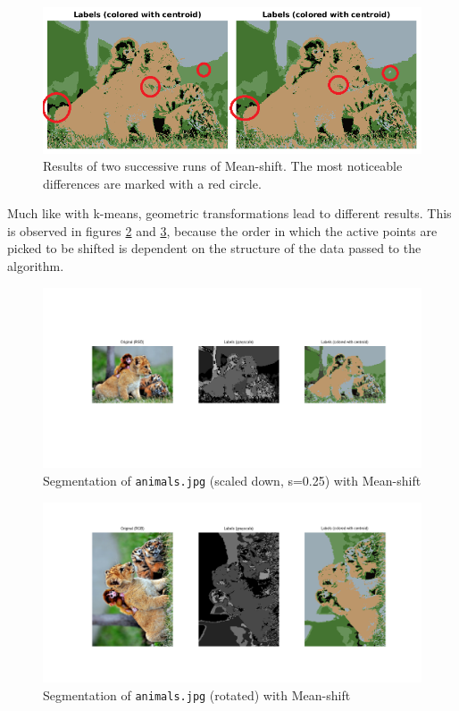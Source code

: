 \begin{figure}[hbt]
\centering
\includegraphics[width=\textwidth]{img/mshift/animals_d30_differences.png}
\caption[Results of two successive runs of Mean-shift]{Results of two successive runs of Mean-shift. The most noticeable differences are marked with a red circle.}
\label{fig:animals-d30-differences}
\end{figure}

Much like with k-means, geometric transformations lead to different results.
This is observed in figures \ref{fig:animals-d30-no-spatial-scaled-down} and
\ref{fig:animals-d30-no-spatial-rotated}, because
the order in which the active points are picked to be shifted is dependent on the
structure of the data passed to the algorithm.

\begin{figure}[hbt]
\centering
\includegraphics[trim={50px 100px 50px 100px},clip,width=\textwidth]{img/mshift/animals_d30_no_spatial_scaled_down.png}
\caption{Segmentation of \texttt{animals.jpg} (scaled down, s=0.25) with Mean-shift}
\label{fig:animals-d30-no-spatial-scaled-down}
\end{figure}

\begin{figure}[hbt]
\centering
\includegraphics[trim={50px 100px 50px 100px},clip,width=\textwidth]{img/mshift/animals_d30_no_spatial_scaled_down_rotated.png}
\caption{Segmentation of \texttt{animals.jpg} (rotated) with Mean-shift}
\label{fig:animals-d30-no-spatial-rotated}
\end{figure}

